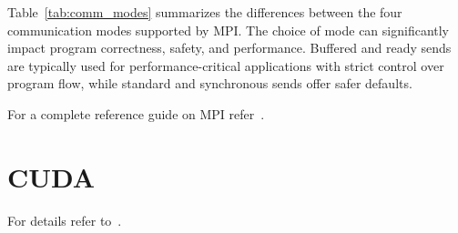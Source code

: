 \documentclass[12pt]{book}
\begin{document}
Table~\ref{tab:comm_modes} summarizes the differences between the four communication modes supported by MPI. The choice of mode can significantly impact program correctness, safety, and performance. Buffered and ready sends are typically used for performance-critical applications with strict control over program flow, while standard and synchronous sends offer safer defaults.

For a complete reference guide on MPI refer~\cite{snir1998mpi}.

\chapter{CUDA}

For details refer to~\cite{nvidia2011nvidia}.





\end{document}
